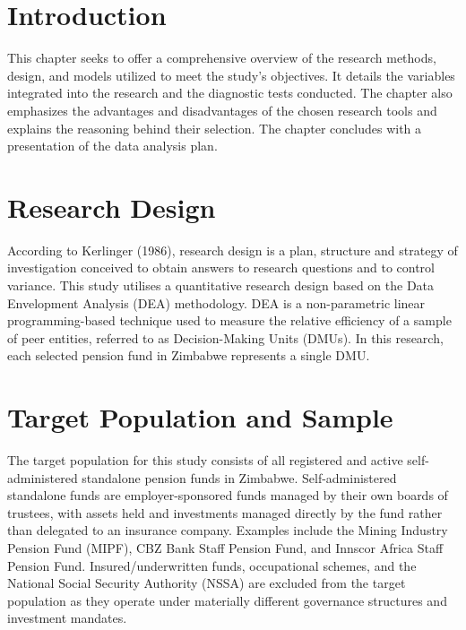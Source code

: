 \documentclass[12pt,a4paper]{article}
\begin{document}
\section{Introduction}

This chapter seeks to offer a comprehensive overview of the research methods, design, and models utilized to meet the study's objectives. It details the variables integrated into the research and the diagnostic tests conducted. The chapter also emphasizes the advantages and disadvantages of the chosen research tools and explains the reasoning behind their selection. The chapter concludes with a presentation of the data analysis plan.

\section{Research Design}

According to Kerlinger (1986), research design is a plan, structure and strategy of investigation conceived to obtain answers to research questions and to control variance. This study utilises a quantitative research design based on the Data Envelopment Analysis (DEA) methodology. DEA is a non-parametric linear programming-based technique used to measure the relative efficiency of a sample of peer entities, referred to as Decision-Making Units (DMUs). In this research, each selected pension fund in Zimbabwe represents a single DMU.

\section{Target Population and Sample}

The target population for this study consists of all registered and active self-administered standalone pension funds in Zimbabwe. Self-administered standalone funds are employer-sponsored funds managed by their own boards of trustees, with assets held and investments managed directly by the fund rather than delegated to an insurance company. Examples include the Mining Industry Pension Fund (MIPF), CBZ Bank Staff Pension Fund, and Innscor Africa Staff Pension Fund. Insured/underwritten funds, occupational schemes, and the National Social Security Authority (NSSA) are excluded from the target population as they operate under materially different governance structures and investment mandates.
\end{document}
